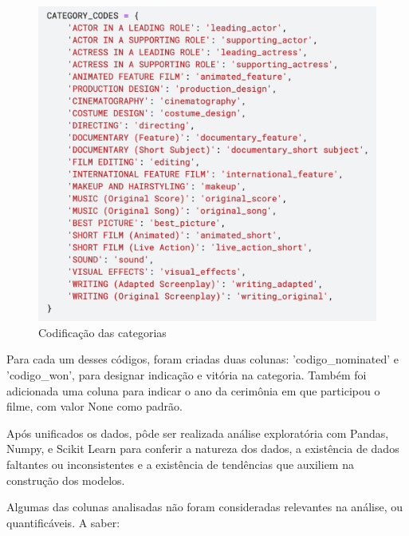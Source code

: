             \begin{figure}[htb]
            	\caption{\label{cat_cods}Codificação das categorias}
            	\begin{center}
            		\includegraphics[scale=0.7]{categ_codes.png}
            	\end{center}
            \end{figure}
            
            Para cada um desses códigos, foram criadas duas colunas: '{codigo}\_nominated' e '{codigo}\_won', para designar indicação e vitória na categoria. Também foi adicionada uma coluna para indicar o ano da cerimônia em que participou o filme, com valor None como padrão.\newline
            
            Após unificados os dados, pôde ser realizada análise exploratória com Pandas, Numpy, e Scikit Learn para conferir a natureza dos dados, a existência de dados faltantes ou inconsistentes e a existência de tendências que auxiliem na construção dos modelos.\newline
    
            Algumas das colunas analisadas não foram consideradas relevantes na análise, ou quantificáveis. A saber:

